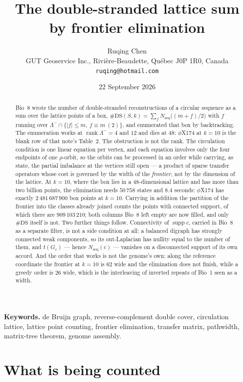 \documentclass[11pt]{article}
\title{\bfseries The double-stranded lattice sum\\ by frontier elimination}
\author{Ruqing Chen\\[2pt]
\normalsize GUT Geoservice Inc., Rivi\`ere-Beaudette, Qu\'ebec J0P 1R0, Canada\\
\normalsize\texttt{ruqing@hotmail.com}}
\date{22 September 2026}
\theoremstyle{plain}
\theoremstyle{definition}
\theoremstyle{remark}
\newcommand{\rank}{\operatorname{rank}}
\newcommand{\supp}{\operatorname{supp}}
\newcommand{\Nseq}{N_{\mathrm{seq}}}
\newcommand{\DS}{\mathrm{DS}}
\newcommand{\Lm}{\Lambda^{-}}
\begin{document}
\maketitle

\begin{abstract}
\noindent
Bio~8 wrote the number of double-stranded reconstructions of a circular sequence as a sum over
the lattice points of a box, $\#\DS(S,k)=\sum_f\Nseq\big((m+f)/2\big)$ with $f$ running over
$\Lm\cap\{|f|\le m,\ f\equiv m\ (2)\}$, and enumerated that box by backtracking. The
enumeration works at $\rank\Lm=4$ and $12$ and dies at $48$: $\phi$X174 at $k=10$ is the blank
row of that note's Table~2. The obstruction is not the rank. The circulation condition is one
linear equation per vertex, and each equation involves only the four endpoints of one
$\rho$-orbit, so the orbits can be processed in an order while carrying, as state, the partial
imbalance at the vertices still open --- a product of sparse transfer operators whose cost is
governed by the width of the \emph{frontier}, not by the dimension of the lattice. At $k=10$,
where the box lies in a $48$-dimensional lattice and has more than two billion points, the
elimination needs $50\,758$ states and $8.4$ seconds: $\phi$X174 has exactly
$2\,481\,687\,900$ box points at $k=10$. Carrying in addition the partition of the frontier
into the classes already joined counts the points with connected support, of which there are
$909\,103\,210$; both columns Bio~8 left empty are now filled, and only $\#\DS$ itself is not.
Two further things follow. Connectivity of $\supp c$,
carried in Bio~8 as a separate filter, is not a side condition at all: a balanced digraph has
strongly connected weak components, so its out-Laplacian has nullity equal to the number of
them, and $t(G_c)$ --- hence $\Nseq(c)$ --- vanishes on a disconnected support of its own
accord. And the order that works is not the genome's own: along the reference coordinate the
frontier at $k=10$ is $62$ wide and the elimination does not finish, while a greedy order is
$26$ wide, which is the interleaving of inverted repeats of Bio~1 seen as a width.
\end{abstract}

\medskip
\noindent\textbf{Keywords.} de Bruijn graph, reverse-complement double cover, circulation
lattice, lattice point counting, frontier elimination, transfer matrix, pathwidth,
matrix-tree theorem, genome assembly.

\section{What is being counted}\label{sec:setup}
\end{document}
